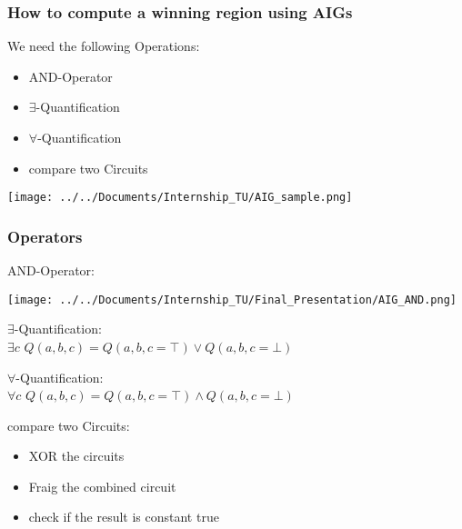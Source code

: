 \documentclass{beamer}
\begin{document}
\begin{frame}
\frametitle{How to compute a winning region using AIGs}


\noindent\begin{minipage}{0.5\textwidth}%
We need the following Operations:
\begin{itemize}
\item AND-Operator
\item $\exists$-Quantification
\item $\forall$-Quantification
\item compare two Circuits
\end{itemize}

\end{minipage}%
\hfill%
\begin{minipage}{0.4\textwidth}
\texttt{[image: ../../Documents/Internship\_TU/AIG\_sample.png]} 
\end{minipage}

\end{frame}


\begin{frame}
\frametitle{Operators}

AND-Operator:

\texttt{[image: ../../Documents/Internship\_TU/Final\_Presentation/AIG\_AND.png]} 


$\exists$-Quantification:\\
$ \exists c$ $Q(a, b, c) = Q(a, b, c=\top) \vee Q(a, b, c=\bot) $\\

\bigskip

$\forall$-Quantification:\\
$ \forall c$ $Q(a, b, c) = Q(a, b, c=\top) \wedge Q(a, b, c=\bot) $

\bigskip

compare two Circuits: \\
\begin{itemize}
\item XOR the circuits
\item Fraig the combined circuit
\item check if the result is constant true
\end{itemize}


\end{frame}

\end{document}
